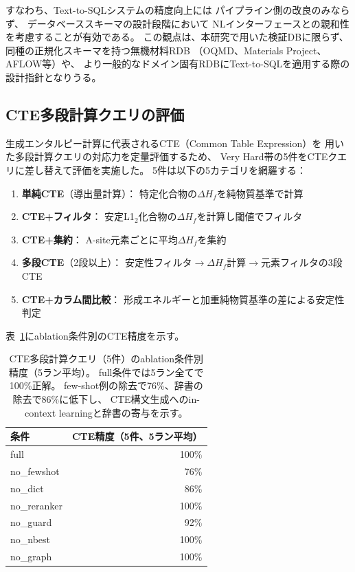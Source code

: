 \documentclass[5p,twocolumn]{elsarticle}
\begin{document}
すなわち、Text-to-SQLシステムの精度向上には
パイプライン側の改良のみならず、
データベーススキーマの設計段階において
NLインターフェースとの親和性を考慮することが有効である。
この観点は、本研究で用いた検証DBに限らず、
同種の正規化スキーマを持つ無機材料RDB
（OQMD、Materials Project、AFLOW等）や、
より一般的なドメイン固有RDBにText-to-SQLを適用する際の
設計指針となりうる。

\subsection{CTE多段計算クエリの評価}
\label{sec:cte_evaluation}

生成エンタルピー計算に代表されるCTE（Common Table Expression）を
用いた多段計算クエリの対応力を定量評価するため、
Very Hard帯の5件をCTEクエリに差し替えて評価を実施した。
5件は以下の5カテゴリを網羅する：

\begin{enumerate}[nosep]
  \item \textbf{単純CTE}（導出量計算）：
    特定化合物の$\Delta H_f$を純物質基準で計算
  \item \textbf{CTE+フィルタ}：
    安定L1$_2$化合物の$\Delta H_f$を計算し閾値でフィルタ
  \item \textbf{CTE+集約}：
    A-site元素ごとに平均$\Delta H_f$を集約
  \item \textbf{多段CTE}（2段以上）：
    安定性フィルタ$\to$$\Delta H_f$計算$\to$元素フィルタの3段CTE
  \item \textbf{CTE+カラム間比較}：
    形成エネルギーと加重純物質基準の差による安定性判定
\end{enumerate}

表~\ref{tab:cte_results}にablation条件別のCTE精度を示す。

\begin{table}[t]
\centering
\caption{CTE多段計算クエリ（5件）のablation条件別精度（5ラン平均）。
full条件では5ラン全てで100\%正解。
few-shot例の除去で76\%、辞書の除去で86\%に低下し、
CTE構文生成へのin-context learningと辞書の寄与を示す。}
\label{tab:cte_results}
\small
\begin{tabular}{@{}lr@{}}
\toprule
条件 & CTE精度（5件、5ラン平均） \\
\midrule
full          & 100\% \\
no\_fewshot   & 76\% \\
no\_dict      & 86\% \\
no\_reranker  & 100\% \\
no\_guard     & 92\% \\
no\_nbest     & 100\% \\
no\_graph     & 100\% \\
\bottomrule
\end{tabular}
\end{table}
\end{document}
